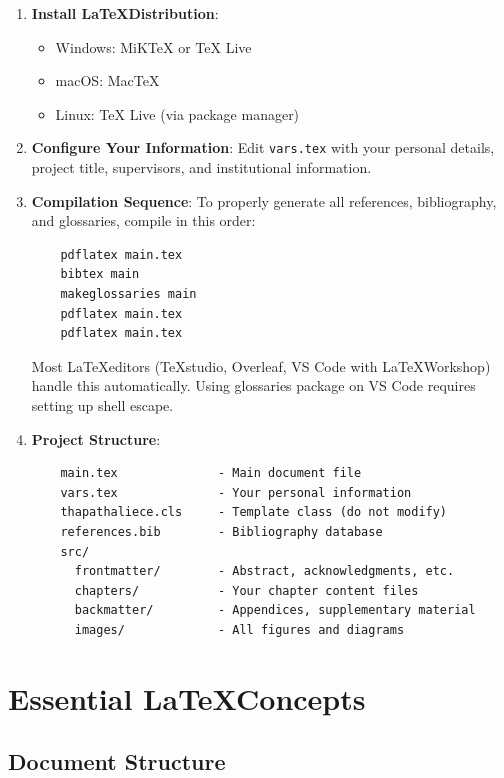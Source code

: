 \begin{enumerate}
    \item \textbf{Install \LaTeX Distribution}:
          \begin{itemize}
              \item Windows: MiKTeX or TeX Live
              \item macOS: MacTeX
              \item Linux: TeX Live (via package manager)
          \end{itemize}

    \item \textbf{Configure Your Information}:
          Edit \texttt{vars.tex} with your personal details, project title, supervisors, and institutional information.

    \item \textbf{Compilation Sequence}:
          To properly generate all references, bibliography, and glossaries, compile in this order:
          \begin{verbatim}
    pdflatex main.tex
    bibtex main
    makeglossaries main
    pdflatex main.tex
    pdflatex main.tex
    \end{verbatim}

          Most \LaTeX editors (TeXstudio, Overleaf, VS Code with \LaTeX Workshop) handle this automatically. Using glossaries package on VS Code requires setting up shell escape.

    \item \textbf{Project Structure}:
          \begin{verbatim}
    main.tex              - Main document file
    vars.tex              - Your personal information
    thapathaliece.cls     - Template class (do not modify)
    references.bib        - Bibliography database
    src/
      frontmatter/        - Abstract, acknowledgments, etc.
      chapters/           - Your chapter content files
      backmatter/         - Appendices, supplementary material
      images/             - All figures and diagrams
    \end{verbatim}
\end{enumerate}

\section*{Essential \LaTeX Concepts}

\subsection*{Document Structure}

